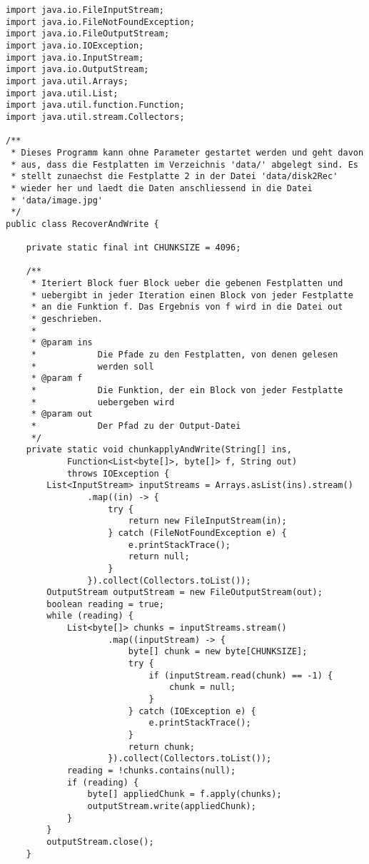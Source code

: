 \documentclass[ngerman]{fbi-aufgabenblatt}
\begin{document}
\begin{lstlisting}
import java.io.FileInputStream;
import java.io.FileNotFoundException;
import java.io.FileOutputStream;
import java.io.IOException;
import java.io.InputStream;
import java.io.OutputStream;
import java.util.Arrays;
import java.util.List;
import java.util.function.Function;
import java.util.stream.Collectors;

/**
 * Dieses Programm kann ohne Parameter gestartet werden und geht davon
 * aus, dass die Festplatten im Verzeichnis 'data/' abgelegt sind. Es
 * stellt zunaechst die Festplatte 2 in der Datei 'data/disk2Rec'
 * wieder her und laedt die Daten anschliessend in die Datei
 * 'data/image.jpg'
 */
public class RecoverAndWrite {

	private static final int CHUNKSIZE = 4096;

	/**
	 * Iteriert Block fuer Block ueber die gebenen Festplatten und
	 * uebergibt in jeder Iteration einen Block von jeder Festplatte
	 * an die Funktion f. Das Ergebnis von f wird in die Datei out
	 * geschrieben.
	 * 
	 * @param ins
	 *            Die Pfade zu den Festplatten, von denen gelesen
	 *            werden soll
	 * @param f
	 *            Die Funktion, der ein Block von jeder Festplatte
	 *            uebergeben wird
	 * @param out
	 *            Der Pfad zu der Output-Datei
	 */
	private static void chunkapplyAndWrite(String[] ins,
			Function<List<byte[]>, byte[]> f, String out)
			throws IOException {
		List<InputStream> inputStreams = Arrays.asList(ins).stream()
				.map((in) -> {
					try {
						return new FileInputStream(in);
					} catch (FileNotFoundException e) {
						e.printStackTrace();
						return null;
					}
				}).collect(Collectors.toList());
		OutputStream outputStream = new FileOutputStream(out);
		boolean reading = true;
		while (reading) {
			List<byte[]> chunks = inputStreams.stream()
					.map((inputStream) -> {
						byte[] chunk = new byte[CHUNKSIZE];
						try {
							if (inputStream.read(chunk) == -1) {
								chunk = null;
							}
						} catch (IOException e) {
							e.printStackTrace();
						}
						return chunk;
					}).collect(Collectors.toList());
			reading = !chunks.contains(null);
			if (reading) {
				byte[] appliedChunk = f.apply(chunks);
				outputStream.write(appliedChunk);
			}
		}
		outputStream.close();
	}


\end{lstlisting}
\end{document}
